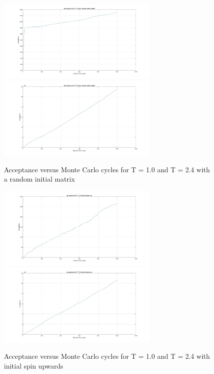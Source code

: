 \documentclass[10pt,a4paper]{article}
\begin{document}
\begin{figure}[H]
\centerline{
\includegraphics[width=0.7\textwidth]{acceptanceMCT1random}
\includegraphics[width=0.7\textwidth]{acceptanceMCT24random}
}
\caption{Acceptance versus Monte Carlo cycles for T = 1.0 and T = 2.4 with a random initial matrix}
\label{fig:acceptancerandom}
\end{figure}

\begin{figure}[H]
\centerline{
\includegraphics[width=0.7\textwidth]{acceptanceMCT1upspin}
\includegraphics[width=0.7\textwidth]{acceptanceMCT24upspin}
}
\caption{Acceptance versus Monte Carlo cycles for T = 1.0 and T = 2.4 with initial spin upwards}
\label{fig:acceptanceupspin}
\end{figure}
\end{document}
